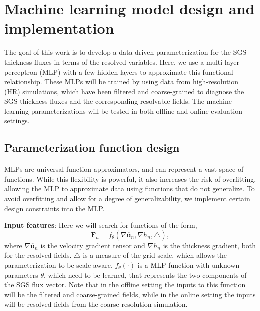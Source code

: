 \documentclass[draft]{agujournal2019}
\begin{document}
\section{Machine learning model design and implementation}
The goal of this work is to develop a data-driven parameterization for the SGS thickness fluxes in terms of the resolved variables. Here, we use a multi-layer perceptron (MLP) with a few hidden layers to approximate this functional relationship. These MLPs will be trained by using data from high-resolution (HR) simulations, which have been filtered and coarse-grained to diagnose the SGS thickness fluxes and the corresponding resolvable fields. The machine learning parameterizations will be tested in both offline and online evaluation settings. 

\subsection{Parameterization function design}
MLPs are universal function approximators, and can represent a vast space of functions. While this flexibility is powerful, it also increases the risk of overfitting, allowing the MLP to approximate data using functions that do not generalize. To avoid overfitting and allow for a degree of generalizability, we implement certain design constraints into the MLP. 

\textbf{Input features}:
Here we will search for functions of the form, 
\begin{equation}
    \mathbf{F}_n = f_{\theta}(\nabla \overline{\mathbf{u}}_n, \nabla \overline{h}_n, \triangle), 
    \label{eqn:gen_ML_func}
\end{equation}
where $\nabla \overline{\mathbf{u}}_n$ is the velocity gradient tensor and $\nabla \overline{h}_n$ is the thickness gradient, both for the resolved fields. 
$\triangle$ is a measure of the grid scale, which allows the parameterization to be scale-aware. $f_{\theta}(\cdot)$ is a MLP function with unknown parameters $\theta$, which need to be learned, that represents the two components of the SGS flux vector. Note that in the offline setting the inputs to this function will be the filtered and coarse-grained fields, while in the online setting the inputs will be resolved fields from the coarse-resolution simulation.

\end{document}

